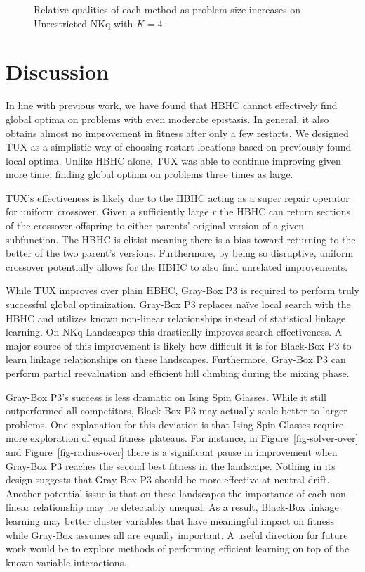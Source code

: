 \begin{figure}
  \centering
  \caption{Relative qualities of each method as problem size increases on Unrestricted NKq
  with $K=4$.}
  \label{fig-length-un}
\end{figure}

\section{Discussion}
In line with previous work, we have found that HBHC cannot effectively find global optima
on problems with even moderate epistasis. In general, it also obtains almost no improvement
in fitness after only a few restarts. We designed TUX as a simplistic way of choosing
restart locations based on previously found local optima. Unlike HBHC alone, TUX
was able to continue improving given more time, finding global optima on problems three
times as large.

TUX's effectiveness is likely due to the HBHC acting as a super repair operator for uniform crossover.
Given a sufficiently large $r$ the HBHC can return sections of the crossover offspring to either
parents' original version of a given subfunction. The HBHC is elitist meaning there is a bias toward
returning to the better of the two parent's versions. Furthermore, by being so disruptive,
uniform crossover potentially allows for the HBHC to also find unrelated improvements.

While TUX improves over plain HBHC, Gray-Box P3 is required to perform truly successful
global optimization. Gray-Box P3 replaces na\"{i}ve local search with the HBHC and utilizes
known non-linear relationships instead of statistical linkage learning. On NKq-Landscapes this drastically
improves search effectiveness. A major source of this improvement is likely how difficult it is
for Black-Box P3 to learn linkage relationships on these landscapes. Furthermore, Gray-Box P3
can perform partial reevaluation and efficient hill climbing during the mixing phase.

Gray-Box P3's success is less dramatic on Ising Spin Glasses.
While it still outperformed all competitors, Black-Box P3 may actually scale better to larger
problems. One explanation for this deviation is that Ising Spin Glasses require more
exploration of equal fitness plateaus. For instance,
in Figure~\ref{fig-solver-over} and Figure~\ref{fig-radius-over}
there is a significant pause in improvement when Gray-Box P3 reaches the second best fitness in the landscape.
Nothing in its design suggests that Gray-Box P3 should be more effective at neutral drift. Another potential
issue is that on these landscapes the importance of each non-linear relationship may be detectably unequal.
As a result, Black-Box linkage learning may better cluster variables that have meaningful
impact on fitness while Gray-Box assumes all are equally important. A useful direction for future work
would be to explore methods of performing efficient learning on top of the known variable interactions.

